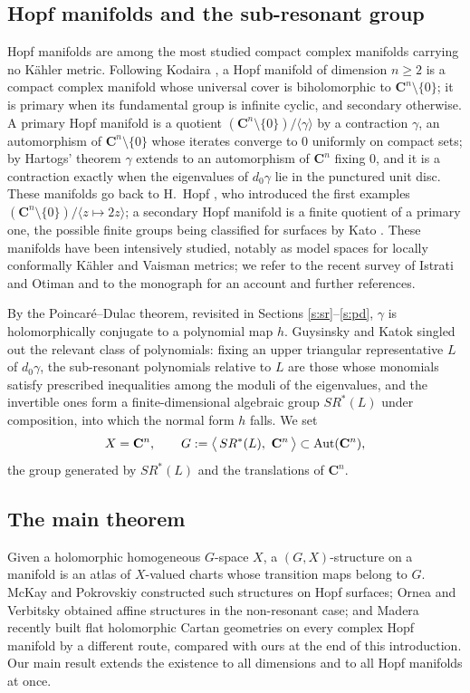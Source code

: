 \documentclass[english,11pt]{amsart}
\theoremstyle{definition}
\theoremstyle{remark}
\numberwithin{equation}{section}
\newcommand{\C}{\mathbf{C}}
\newcommand{\Aut}{\mathop{\rm Aut}}
\begin{document}
\subsection*{Hopf manifolds and the sub-resonant group}
Hopf manifolds are among the most studied compact complex manifolds carrying no K\"ahler metric. Following Kodaira \cite{Kodaira}, a Hopf manifold of dimension $n\geq2$ is a compact complex manifold whose universal cover is biholomorphic to $\C^n\setminus\{0\}$; it is primary when its fundamental group is infinite cyclic, and secondary otherwise. A primary Hopf manifold is a quotient $(\C^n\setminus\{0\})/\langle\gamma\rangle$ by a contraction $\gamma$, an automorphism of $\C^n\setminus\{0\}$ whose iterates converge to $0$ uniformly on compact sets; by Hartogs' theorem $\gamma$ extends to an automorphism of $\C^n$ fixing $0$, and it is a contraction exactly when the eigenvalues of $d_0\gamma$ lie in the punctured unit disc. These manifolds go back to H.~Hopf \cite{Hopf}, who introduced the first examples $(\C^n\setminus\{0\})/\langle z\mapsto 2z\rangle$; a secondary Hopf manifold is a finite quotient of a primary one, the possible finite groups being classified for surfaces by Kato \cite{Kato}. These manifolds have been intensively studied, notably as model spaces for locally conformally K\"ahler and Vaisman metrics; we refer to the recent survey of Istrati and Otiman \cite{IstratiOtiman} and to the monograph \cite{OrneaVerbitsky} for an account and further references.

By the Poincar\'e--Dulac theorem, revisited in Sections \ref{s:sr}--\ref{s:pd}, $\gamma$ is holomorphically conjugate to a polynomial map $h$. Guysinsky and Katok \cite{Katok} singled out the relevant class of polynomials: fixing an upper triangular representative $L$ of $d_0\gamma$, the sub-resonant polynomials relative to $L$ are those whose monomials satisfy prescribed inequalities among the moduli of the eigenvalues, and the invertible ones form a finite-dimensional algebraic group $SR^*(L)$ under composition, into which the normal form $h$ falls. We set
\[
X=\C^n,\qquad G:=\big\langle\, SR^*(L),\ \C^n \,\big\rangle \subset \Aut(\C^n),
\]
the group generated by $SR^*(L)$ and the translations of $\C^n$.

\subsection*{The main theorem}
Given a holomorphic homogeneous $G$-space $X$, a $(G,X)$-structure on a manifold is an atlas of $X$-valued charts whose transition maps belong to $G$. McKay and Pokrovskiy \cite{Mckay} constructed such structures on Hopf surfaces; Ornea and Verbitsky \cite{Verbi} obtained affine structures in the non-resonant case; and Madera \cite{Madera} recently built flat holomorphic Cartan geometries on every complex Hopf manifold by a different route, compared with ours at the end of this introduction. Our main result extends the existence to all dimensions and to all Hopf manifolds at once.
\end{document}
